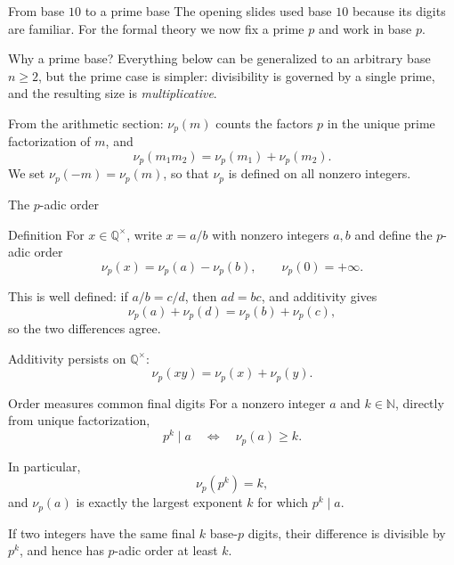 \documentclass[aspectratio=169,11pt]{beamer}
\newcommand{\N}{\mathbb N}
\newcommand{\Q}{\mathbb Q}
\begin{document}
\begin{frame}{From base \(10\) to a prime base}
  The opening slides used base \(10\) because its digits are familiar.
  For the formal theory we now fix a \alert{prime} \(p\) and work in base
  \(p\).

  \begin{block}{Why a prime base?}
    Everything below can be generalized to an arbitrary base \(n\ge2\),
    but the prime case is simpler: divisibility is governed by a single
    prime, and the resulting size is \emph{multiplicative}.
  \end{block}

  From the arithmetic section: \(\nu_p(m)\) counts the factors \(p\) in
  the unique prime factorization of \(m\), and
  \[
    \nu_p(m_1m_2)=\nu_p(m_1)+\nu_p(m_2).
  \]
  We set \(\nu_p(-m)=\nu_p(m)\), so that \(\nu_p\) is defined on all
  nonzero integers.
\end{frame}

\begin{frame}{The \(p\)-adic order}
  \begin{block}{Definition}
    For \(x\in\Q^\times\), write \(x=a/b\) with nonzero integers \(a,b\)
    and define the \alert{\(p\)-adic order}
    \[
      \boxed{\nu_p(x)=\nu_p(a)-\nu_p(b),
      \qquad
      \nu_p(0)=+\infty.}
    \]
  \end{block}

  This is well defined: if \(a/b=c/d\), then \(ad=bc\), and additivity
  gives
  \[
    \nu_p(a)+\nu_p(d)=\nu_p(b)+\nu_p(c),
  \]
  so the two differences agree.

  Additivity persists on \(\Q^\times\):
  \[
    \nu_p(xy)=\nu_p(x)+\nu_p(y).
  \]
\end{frame}

\begin{frame}{Order measures common final digits}
  For a nonzero integer \(a\) and \(k\in\N\), directly from unique
  factorization,
  \[
    \boxed{p^k\mid a\quad\Longleftrightarrow\quad \nu_p(a)\ge k.}
  \]

  In particular,
  \[
    \nu_p(p^k)=k,
  \]
  and \(\nu_p(a)\) is exactly the largest exponent \(k\) for which
  \(p^k\mid a\).

  If two integers have the same final \(k\) base-\(p\) digits, their
  difference is divisible by \(p^k\), and hence has \(p\)-adic order at
  least \(k\).
\end{frame}
\end{document}
